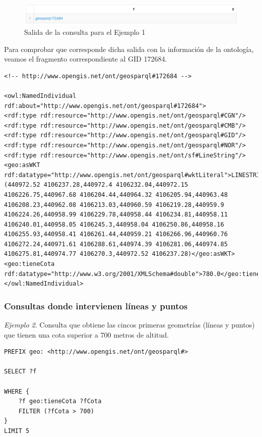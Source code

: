 \begin{figure}[H]
	\centering
	\includegraphics[width=0.9\linewidth]{imagenes/capitulo5/salida1}
	\caption{Salida de la consulta para el Ejemplo 1}
	\label{fig:salida1}
\end{figure}

Para comprobar que corresponde dicha salida con la información de la ontología, veamos el fragmento correspondiente al GID 172684.

\begin{lstlisting}
<!-- http://www.opengis.net/ont/geosparql#172684 -->

<owl:NamedIndividual rdf:about="http://www.opengis.net/ont/geosparql#172684">
<rdf:type rdf:resource="http://www.opengis.net/ont/geosparql#CGN"/>
<rdf:type rdf:resource="http://www.opengis.net/ont/geosparql#CMB"/>
<rdf:type rdf:resource="http://www.opengis.net/ont/geosparql#GID"/>
<rdf:type rdf:resource="http://www.opengis.net/ont/geosparql#NOR"/>
<rdf:type rdf:resource="http://www.opengis.net/ont/sf#LineString"/>
<geo:asWKT rdf:datatype="http://www.opengis.net/ont/geosparql#wktLiteral">LINESTRING (440972.52 4106237.28,440972.4 4106232.04,440972.15 4106226.75,440967.68 4106204.44,440964.32 4106205.94,440963.48 4106208.23,440962.08 4106213.03,440960.59 4106219.28,440959.9 4106224.26,440958.99 4106229.78,440958.44 4106234.81,440958.11 4106240.01,440958.05 4106245.3,440958.04 4106250.86,440958.16 4106255.93,440958.41 4106261.44,440959.21 4106266.96,440960.76 4106272.24,440971.61 4106288.61,440974.39 4106281.06,440974.85 4106275.81,440974.77 4106270.3,440972.52 4106237.28)</geo:asWKT>
<geo:tieneCota rdf:datatype="http://www.w3.org/2001/XMLSchema#double">780.0</geo:tieneCota>
</owl:NamedIndividual>
\end{lstlisting}

\subsubsection{Consultas donde intervienen líneas y puntos}

\textit{Ejemplo 2}. Consulta que obtiene las cincos primeras geometrías (líneas y puntos) que tienen una cota superior a 700 metros de altitud.\\

\begin{lstlisting}
PREFIX geo: <http://www.opengis.net/ont/geosparql#>

SELECT ?f

WHERE {
	?f geo:tieneCota ?fCota
	FILTER (?fCota > 700)
}
LIMIT 5
\end{lstlisting}


